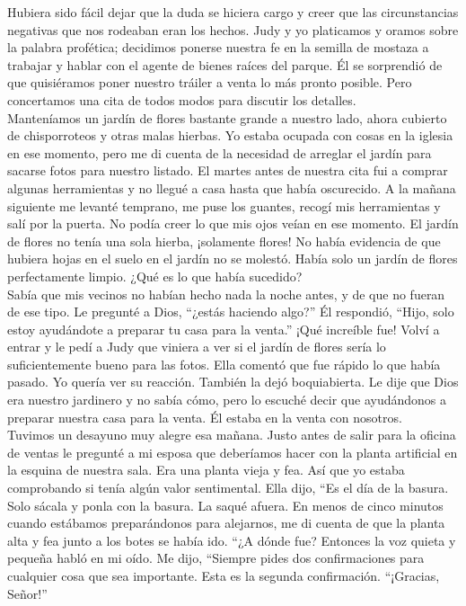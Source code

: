 \documentclass[twoside, 12pt]{book}
\begin{document}
Hubiera sido fácil dejar que la duda se hiciera cargo y creer que las circunstancias negativas que nos rodeaban eran los hechos. Judy y yo platicamos y oramos sobre la palabra profética; decidimos ponerse nuestra fe en la semilla de mostaza a trabajar y hablar con el agente de bienes raíces del parque. Él se sorprendió de que quisiéramos poner nuestro tráiler a venta lo más pronto posible. Pero concertamos una cita de todos modos para discutir los detalles.\\

Manteníamos un jardín de flores bastante grande a nuestro lado, ahora cubierto de chisporroteos y otras malas hierbas. Yo estaba ocupada con cosas en la iglesia en ese momento, pero me di cuenta de la necesidad de arreglar el jardín para sacarse fotos para nuestro listado. El martes antes de nuestra cita fui a comprar algunas herramientas y no llegué a casa hasta que había oscurecido. A la mañana siguiente me levanté temprano, me puse los guantes, recogí mis herramientas y salí por la puerta. No podía creer lo que mis ojos veían en ese momento. El jardín de flores no tenía una sola hierba, ¡solamente flores! No había evidencia de que hubiera hojas en el suelo en el jardín no se molestó. Había solo un jardín de flores perfectamente limpio.  ¿Qué es lo que había sucedido?\\

Sabía que mis vecinos no habían hecho nada la noche antes, y de que no fueran de ese tipo. Le pregunté a Dios, “¿estás haciendo algo?” Él respondió, “Hijo, solo estoy ayudándote a preparar tu casa para la venta.” ¡Qué increíble fue! Volví a entrar y le pedí a Judy que viniera a ver si el jardín de flores sería lo suficientemente bueno para las fotos. Ella comentó que fue rápido lo que había pasado. Yo quería ver su reacción. También la dejó boquiabierta. Le dije que Dios era nuestro jardinero y no sabía cómo, pero lo escuché decir que ayudándonos a preparar nuestra casa para la venta. Él estaba en la venta con nosotros.\\

Tuvimos un desayuno muy alegre esa mañana. Justo antes de salir para la oficina de ventas le pregunté a mi esposa que deberíamos hacer con la planta artificial en la esquina de nuestra sala. Era una planta vieja y fea. Así que yo estaba comprobando si tenía algún valor sentimental. Ella dijo, “Es el día de la basura. Solo sácala y ponla con la basura. La saqué afuera. En menos de cinco minutos cuando estábamos preparándonos para alejarnos, me di cuenta de que la planta alta y fea junto a los botes se había ido. “¿A dónde fue? Entonces la voz quieta y pequeña habló en mi oído. Me dijo, “Siempre pides dos confirmaciones para cualquier cosa que sea importante. Esta es la segunda confirmación. “¡Gracias, Señor!”\\
\end{document}
